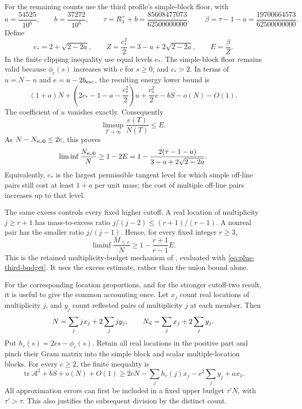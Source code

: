 \documentclass[11pt,reqno]{amsart}
\numberwithin{equation}{section}
\begin{document}
For the remaining counts use the third profile's simple-block floor,
with
\begin{equation}
 a=\frac{54525}{10^6},\qquad b=\frac{37272}{10^6},\qquad
 \tau=R_3^++b=\frac{85608477073}{62500000000},\qquad
 \beta=\tau-1-a=\frac{19700664573}{62500000000}.
 \label{eq:plus-third-budget}
\end{equation}
Define
\begin{equation}
 c_*=2+\sqrt{2-2a},\qquad
 Z=\frac{c_*^2}{2}=3-a+2\sqrt{2-2a},\qquad E=\frac\beta Z.
 \label{eq:plus-excess-budget}
\end{equation}
In the finite clipping inequality use equal levels $c_*$. The
simple-block floor remains valid because $\phi_c(s)$ increases with
$c$ for $s\ge0$, and $c_*>2$. In terms of $u=N-n$ and
$e=u-2b_{\rm exc}$, the resulting energy lower bound is
\[
 (1+a)N+
 \left(2c_*-1-a-\frac{c_*^2}{2}\right)u
 +\frac{c_*^2}{2}e-bS-o(N)-O(1).
\]
The coefficient of $u$ vanishes exactly. Consequently
\begin{equation}
 \limsup_{T\to\infty}\frac{e(T)}{N(T)}\le E.
 \label{eq:plus-excess-limit}
\end{equation}
As $N-N_{\rm s\cup0}\le2e$, this proves
\begin{equation}
 \liminf\frac{N_{\rm s\cup0}}N\ge1-2E
 =1-\frac{2(\tau-1-a)}{3-a+2\sqrt{2-2a}}.
 \label{eq:plus-union}
\end{equation}
Equivalently, $c_*$ is the largest permissible tangent level for
which simple off-line pairs still cost at least $1+a$ per unit mass;
the cost of multiple off-line pairs increases up to that level.

The same excess controls every fixed higher cutoff. A real location
of multiplicity $j\ge r+1$ has mass-to-excess ratio
$j/(j-2)\le(r+1)/(r-1)$. A nonreal pair has the smaller ratio
$j/(j-1)$. Hence, for every fixed integer $r\ge3$,
\begin{equation}
 \liminf\frac{M_{\le r}}N
 \ge1-\frac{r+1}{r-1}E.
 \label{eq:plus-higher-mass}
\end{equation}
This is the retained multiplicity-budget mechanism of
\cite{Waddle,ChandruP6}, evaluated with \eqref{eq:plus-third-budget}.
It uses the excess estimate, rather than the union bound alone.

For the corresponding location proportions, and for the stronger
cutoff-two result, it is useful to give the common accounting once.
Let $x_j$ count real locations of multiplicity $j$, and $y_j$ count
reflected pairs of multiplicity $j$ at each member. Then
\[
 N=\sum_jjx_j+2\sum_jjy_j,\qquad
 N_{\rm d}=\sum_jx_j+2\sum_jy_j.
\]
Put $h_c(s)=2cs-\phi_c(s)$. Retain all real locations in the positive
part and pinch their Gram matrix into the simple block and scalar
multiple-location blocks. For every $c\ge2$, the finite inequality is
\begin{equation}
 \operatorname{tr}\mathcal A^2+bS+o(N)+O(1)
 \ge 2cN-\sum_jh_c(j)x_j-c^2\sum_jy_j+ax_1.
 \label{eq:plus-multiplicity-master}
\end{equation}
All approximation errors can first be included in a fixed upper
budget $\tau' N$, with $\tau'>\tau$. This also justifies the
subsequent division by the distinct count.
\end{document}
